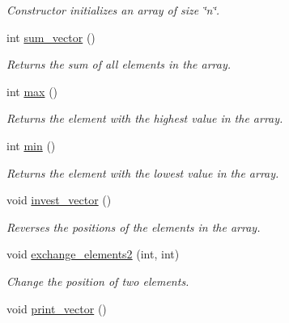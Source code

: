 \begin{DoxyCompactItemize}
\begin{DoxyCompactList}\small\item\em Constructor initializes an array of size \char`\"{}n\char`\"{}. \end{DoxyCompactList}\item 
\hypertarget{classarray_adc0ddb6f7348edf390b97e883f4ee773}{int \hyperlink{classarray_adc0ddb6f7348edf390b97e883f4ee773}{sum\-\_\-vector} ()}\label{classarray_adc0ddb6f7348edf390b97e883f4ee773}

\begin{DoxyCompactList}\small\item\em Returns the sum of all elements in the array. \end{DoxyCompactList}\item 
\hypertarget{classarray_aae5279d424036f187c6aa516bbd83c5c}{int \hyperlink{classarray_aae5279d424036f187c6aa516bbd83c5c}{max} ()}\label{classarray_aae5279d424036f187c6aa516bbd83c5c}

\begin{DoxyCompactList}\small\item\em Returns the element with the highest value in the array. \end{DoxyCompactList}\item 
\hypertarget{classarray_a9787f152f19d3efaa10661fd8ab5d984}{int \hyperlink{classarray_a9787f152f19d3efaa10661fd8ab5d984}{min} ()}\label{classarray_a9787f152f19d3efaa10661fd8ab5d984}

\begin{DoxyCompactList}\small\item\em Returns the element with the lowest value in the array. \end{DoxyCompactList}\item 
\hypertarget{classarray_ac3d618d2d45fc6734b870e69175191a5}{void \hyperlink{classarray_ac3d618d2d45fc6734b870e69175191a5}{invest\-\_\-vector} ()}\label{classarray_ac3d618d2d45fc6734b870e69175191a5}

\begin{DoxyCompactList}\small\item\em Reverses the positions of the elements ​​in the array. \end{DoxyCompactList}\item 
\hypertarget{classarray_a38eae774a7eba29581bf399f33309ffc}{void \hyperlink{classarray_a38eae774a7eba29581bf399f33309ffc}{exchange\-\_\-elements2} (int, int)}\label{classarray_a38eae774a7eba29581bf399f33309ffc}

\begin{DoxyCompactList}\small\item\em Change the position of two elements. \end{DoxyCompactList}\item 
\hypertarget{classarray_a6fc40f0a530525bb91835af4dcd20565}{void \hyperlink{classarray_a6fc40f0a530525bb91835af4dcd20565}{print\-\_\-vector} ()}\label{classarray_a6fc40f0a530525bb91835af4dcd20565}


\end{DoxyCompactItemize}
